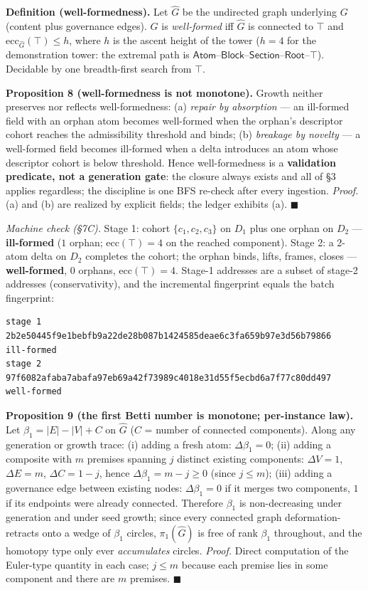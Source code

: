 \documentclass[
  10pt,
]{article}
\begin{document}
\textbf{Definition (well-formedness).} Let \(\widehat G\) be the
undirected graph underlying \(G\) (content plus governance edges). \(G\)
is \emph{well-formed} iff \(\widehat G\) is connected to \(\top\) and
\(\mathrm{ecc}_{\widehat G}(\top) \le h\), where \(h\) is the ascent
height of the tower (\(h = 4\) for the demonstration tower: the extremal
path is
\(\mathsf{Atom}\)--\(\mathsf{Block}\)--\(\mathsf{Section}\)--\(\mathsf{Root}\)--\(\top\)).
Decidable by one breadth-first search from \(\top\).

\textbf{Proposition 8 (well-formedness is not monotone).} Growth neither
preserves nor reflects well-formedness: (a) \emph{repair by absorption}
--- an ill-formed field with an orphan atom becomes well-formed when the
orphan's descriptor cohort reaches the admissibility threshold and
binds; (b) \emph{breakage by novelty} --- a well-formed field becomes
ill-formed when a delta introduces an atom whose descriptor cohort is
below threshold. Hence well-formedness is a \textbf{validation
predicate, not a generation gate}: the closure always exists and all of
§3 applies regardless; the discipline is one BFS re-check after every
ingestion. \emph{Proof.} (a) and (b) are realized by explicit fields;
the ledger exhibits (a). \(\blacksquare\)

\emph{Machine check (§7C).} Stage 1: cohort \(\{c_1,c_2,c_3\}\) on
\(D_1\) plus one orphan on \(D_2\) --- \textbf{ill-formed} (\(1\)
orphan; \(\mathrm{ecc}(\top)=4\) on the reached component). Stage 2: a
2-atom delta on \(D_2\) completes the cohort; the orphan binds, lifts,
frames, closes --- \textbf{well-formed}, \(0\) orphans,
\(\mathrm{ecc}(\top) = 4\). Stage-1 addresses are a subset of stage-2
addresses (conservativity), and the incremental fingerprint equals the
batch fingerprint:

\begin{verbatim}
stage 1   2b2e50445f9e1bebfb9a22de28b087b1424585deae6c3fa659b97e3d56b79866   ill-formed
stage 2   97f6082afaba7abafa97eb69a42f73989c4018e31d55f5ecbd6a7f77c80dd497   well-formed
\end{verbatim}

\textbf{Proposition 9 (the first Betti number is monotone; per-instance
law).} Let \(\beta_1 = |E| - |V| + C\) on \(\widehat G\) (\(C\) = number
of connected components). Along any generation or growth trace: (i)
adding a fresh atom: \(\Delta\beta_1 = 0\); (ii) adding a composite with
\(m\) premises spanning \(j\) distinct existing components:
\(\Delta V = 1\), \(\Delta E = m\), \(\Delta C = 1 - j\), hence
\(\Delta\beta_1 = m - j \ge 0\) (since \(j \le m\)); (iii) adding a
governance edge between existing nodes: \(\Delta\beta_1 = 0\) if it
merges two components, \(1\) if its endpoints were already connected.
Therefore \(\beta_1\) is non-decreasing under generation and under seed
growth; since every connected graph deformation-retracts onto a wedge of
\(\beta_1\) circles, \(\pi_1(\widehat G)\) is free of rank \(\beta_1\)
throughout, and the homotopy type only ever \emph{accumulates} circles.
\emph{Proof.} Direct computation of the Euler-type quantity in each
case; \(j \le m\) because each premise lies in some component and there
are \(m\) premises. \(\blacksquare\)
\end{document}
